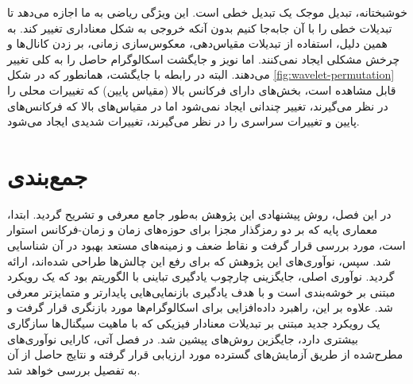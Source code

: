 خوشبختانه، تبدیل موجک یک تبدیل خطی است. این ویژگی ریاضی به ما اجازه می‌دهد تا تبدیلات خطی را با آن جابه‌جا کنیم بدون آنکه خروجی به شکل معناداری تغییر کند. به همین دلیل، استفاده از تبدیلات مقیاس‌دهی، معکوس‌سازی زمانی، بر زدن کانال‌ها و چرخش مشکلی ایجاد نمی‌کنند. اما نویز و جایگشت اسکالوگرام حاصل را به کلی تغییر می‌دهند. البته در رابطه با جایگشت، همانطور که در شکل \ref{fig:wavelet-permutation} قابل مشاهده است،
بخش‌های دارای فرکانس بالا (مقیاس پایین) که تغییرات محلی را در نظر می‌گیرند، تغییر چندانی ایجاد نمی‌شود اما در مقیاس‌های بالا که فرکانس‌های پایین و تغییرات سراسری را در نظر می‌گیرند، تغییرات شدیدی ایجاد می‌شود.

\section{جمع‌بندی}

در این فصل، روش پیشنهادی این پژوهش به‌طور جامع معرفی و تشریح گردید. ابتدا، معماری پایه که بر دو رمزگذار مجزا برای حوزه‌های زمان و زمان-فرکانس استوار است، مورد بررسی قرار گرفت و نقاط ضعف و زمینه‌های مستعد بهبود در آن شناسایی شد. سپس، نوآوری‌های این پژوهش که برای رفع این چالش‌ها طراحی شده‌اند، ارائه گردید. نوآوری اصلی، جایگزینی چارچوب یادگیری تباینی  با الگوریتم  بود که یک رویکرد مبتنی بر خوشه‌بندی است و با هدف یادگیری بازنمایی‌هایی پایدارتر و متمایزتر معرفی شد. علاوه بر این، راهبرد داده‌افزایی برای اسکالوگرام‌ها مورد بازنگری قرار گرفت و یک رویکرد جدید مبتنی بر تبدیلات معنادار فیزیکی که با ماهیت سیگنال‌ها سازگاری بیشتری دارد، جایگزین روش‌های پیشین شد. در فصل آتی، کارایی نوآوری‌های مطرح‌شده از طریق آزمایش‌های گسترده مورد ارزیابی قرار گرفته و نتایج حاصل از آن به تفصیل بررسی خواهد شد.
